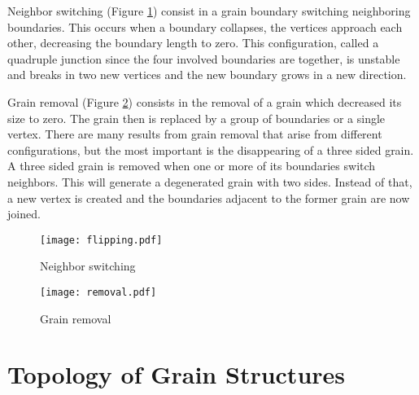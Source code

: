 Neighbor switching (Figure \ref{fig:flipping}) consist in a grain boundary switching neighboring boundaries. This occurs when a boundary collapses, the vertices approach each other, decreasing the boundary length to zero. This configuration, called a quadruple junction since the four involved boundaries are together, is unstable and breaks in two new vertices and the new boundary grows in a new direction.

Grain removal (Figure \ref{fig:removal}) consists in the removal of a grain which decreased its size to zero. The grain then is replaced by a group of boundaries or a single vertex. There are many results from grain removal that arise from different configurations, but the most important is the disappearing of a three sided grain. A three sided grain is removed when one or more of its boundaries switch neighbors. This will generate a degenerated grain with two sides. Instead of that, a new vertex is created and the boundaries adjacent to the former grain are now joined.


\begin{figure}[t]
    \centering
    \texttt{[image: flipping.pdf]}
    \caption{Neighbor switching}
    \label{fig:flipping}
\end{figure}

\begin{figure}[t]
    \centering
    \texttt{[image: removal.pdf]}
    \caption{Grain removal}
    \label{fig:removal}
\end{figure}

\section{Topology of Grain Structures}

